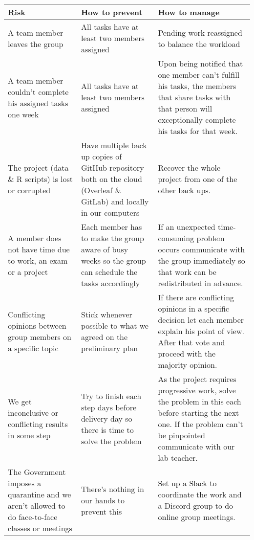 \begin{table}[H]
\centering
\begin{tabular}{@{}p{5cm}p{5cm}p{5cm}@{}}
\toprule
Risk & How to prevent & How to manage \\ \midrule
A team member leaves the group & All tasks have at least two members assigned & Pending work reassigned to balance the workload\\
\addlinespace[0.5em]
A team member couldn't complete his assigned tasks one week & All tasks have at least two members assigned & Upon being notified that one member can't fulfill his tasks, the members that share tasks with that person will exceptionally complete his tasks for that week.\\
\addlinespace[0.5em]
The project (data \& R scripts) is lost or corrupted & Have multiple back up copies of GitHub repository both on the cloud (Overleaf \& GitLab) and locally in our computers & Recover the whole project from one of the other back ups.\\
\addlinespace[0.5em]
A member does not have time due to work, an exam or a project & Each member has to make the group aware of busy weeks so the group can schedule the tasks accordingly & If an unexpected time-consuming problem occurs communicate with the group immediately so that work can be redistributed in advance.\\
\addlinespace[0.5em]
Conflicting opinions between group members on a specific topic & Stick whenever possible to what we agreed on the preliminary plan & If there are conflicting opinions in a specific decision let each member explain his point of view. After that vote and proceed with the majority opinion.\\
\addlinespace[0.5em]
We get inconclusive or conflicting results in some step & Try to finish each step days before delivery day so there is time to solve the problem & As the project requires progressive work, solve the problem in this each before starting the next one. If the problem can't be pinpointed communicate with our lab teacher.  
\\
\addlinespace[0.5em]
The Government imposes a quarantine and we aren't allowed to do face-to-face classes or meetings & There's nothing in our hands to prevent this & Set up a Slack to coordinate the work and a Discord group to do online group meetings.\\

\bottomrule
\end{tabular}
\end{table}

